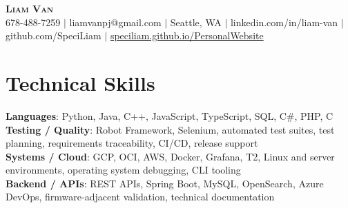 \documentclass[letterpaper,11pt]{article}
\begin{document}

%
\begin{center}
    \textbf{\Huge \scshape Liam Van} \\ \vspace{1pt}
    \small 678-488-7259 $|$ \small {liamvanpj@gmail.com} $|$ Seattle, WA
 {{$|$ linkedin.com/in/liam-van} {$|$ github.com/SpeciLiam} {$|$ \href{https://speciliam.github.io/PersonalWebsite}{speciliam.github.io/PersonalWebsite}}}

\end{center}

\section{Technical Skills}
 \begin{itemize}[leftmargin=0.15in, label={}]
    \small{\item{
     \textbf{Languages}{: Python, Java, C++, JavaScript, TypeScript, SQL, C\#, PHP, C} \\
     \textbf{Testing / Quality}{: Robot Framework, Selenium, automated test suites, test planning, requirements traceability, CI/CD, release support} \\
     \textbf{Systems / Cloud}{: GCP, OCI, AWS, Docker, Grafana, T2, Linux and server environments, operating system debugging, CLI tooling} \\
     \textbf{Backend / APIs}{: REST APIs, Spring Boot, MySQL, OpenSearch, Azure DevOps, firmware-adjacent validation, technical documentation} \\
    }}
 \end{itemize}
%
\end{document}

